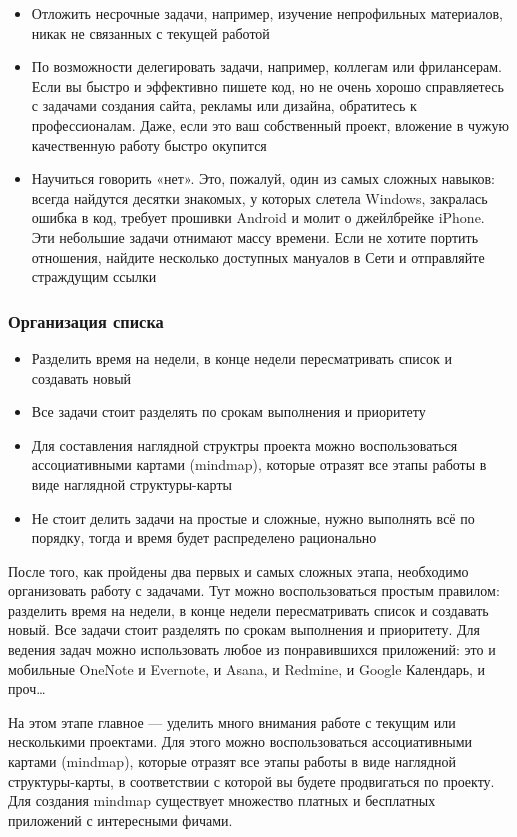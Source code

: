 \documentclass{../industrial-development}
\begin{document}
\begin{itemize}
\item Отложить несрочные задачи, например, изучение непрофильных материалов, никак не связанных с текущей работой
\item По возможности делегировать задачи, например, коллегам или фрилансерам. Если вы быстро и эффективно пишете код, но не очень хорошо справляетесь с задачами создания сайта, рекламы или дизайна, обратитесь к профессионалам. Даже, если это ваш собственный проект, вложение в чужую качественную работу быстро окупится
\item Научиться говорить «нет». Это, пожалуй, один из самых сложных навыков: всегда найдутся десятки знакомых, у которых слетела Windows, закралась ошибка в код, требует прошивки Android и молит о джейлбрейке iPhone. Эти небольшие задачи отнимают массу времени. Если не хотите портить отношения, найдите несколько доступных мануалов в Сети и отправляйте страждущим ссылки~\cite{GTDHabr}
\end{itemize}

\begin{frame} \frametitle{Организация списка}
  \begin{itemize}
  \item Разделить время на недели, в конце недели пересматривать список и создавать новый
  \item Все задачи стоит разделять по срокам выполнения и приоритету
  \item Для составления наглядной структры проекта можно воспользоваться ассоциативными картами (mindmap), которые отразят все этапы работы в виде наглядной структуры-карты
  \item Не стоит делить задачи на простые и сложные, нужно выполнять всё по порядку, тогда и время будет распределено рационально
  \end{itemize}
\end{frame}

\lecturenotes

После того, как пройдены два первых и самых сложных этапа, необходимо организовать работу с задачами. Тут можно воспользоваться простым правилом: разделить время на недели, в конце недели пересматривать список и создавать новый. Все задачи стоит разделять по срокам выполнения и приоритету. Для ведения задач можно использовать любое из понравившихся приложений: это и мобильные OneNote и Evernote, и Asana, и Redmine, и Google Календарь, и проч…

На этом этапе главное — уделить много внимания работе с текущим или несколькими проектами. Для этого можно воспользоваться ассоциативными картами (mindmap), которые отразят все этапы работы в виде наглядной структуры-карты, в соответствии с которой вы будете продвигаться по проекту. Для создания mindmap существует множество платных и бесплатных приложений с интересными фичами.
\end{document}
